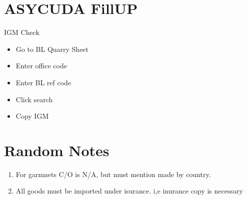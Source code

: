 \documentclass[10pt]{article}
\begin{document}
\section{ASYCUDA FillUP}\label{asycuda}

\begin{description}
    \item [IGM Check]
\end{description}
\begin{itemize}
        \item Go to BL Quarry Sheet
        \item Enter office code
        \item Enter BL ref code
        \item Click search
        \item Copy IGM
\end{itemize}

\section{Random Notes}\label{NB}

\begin{enumerate}
        \item For garmnets C/O is N/A, but must mention made by country.
        \item All goods must be imported under isurance.
            i,e inurance copy is necessary
\end{enumerate}
\end{document}
